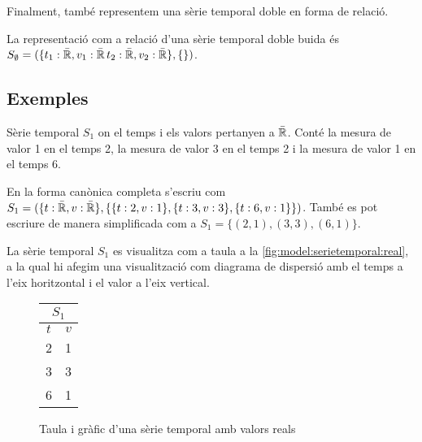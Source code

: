 Finalment, també representem una sèrie temporal doble en forma de
relació.
\begin{definition}
  La representació com a relació d'una sèrie temporal doble buida és
  $S_{\emptyset} = ( \{t_1: \bar{\mathbb{R}{}}, v_1: \bar{\mathbb{R}{}}\,
  t_2: \bar{\mathbb{R}{}}, v_2: \bar{\mathbb{R}{}}\}, \{ \} )$.
\end{definition}




\subsection{Exemples}




\begin{example}
  Sèrie temporal $S_1$ on el temps i els valors pertanyen a
  $\bar{\mathbb{R}{}}$. Conté la mesura de valor 1 en el temps 2, la mesura de
  valor 3 en el temps 2 i la mesura de valor 1 en el temps 6.

En la forma canònica completa s'escriu com $S_1 = ( \{t:
\bar{\mathbb{R}{}}, v: \bar{\mathbb{R}{}}\}, \{ \{t:2,v:1\}, \{t:3,v:3\},
\{t:6,v:1\} \} )$. També es pot escriure de manera simplificada com a
$S_1 = \{ (2,1), (3,3), (6,1) \}$.


La sèrie temporal $S_1$ es visualitza com a taula a la
\autoref{fig:model:serietemporal:real}, a la qual hi afegim una
visualització com diagrama de dispersió amb el temps a l'eix
horitzontal i el valor a l'eix vertical.

\begin{figure}[tp]
  \centering
  \begin{tabular}[c]{|c|c|}
    \multicolumn{2}{c}{$S_1$} \\ \hline
    $t$  & $v$ \\ \hline
    2  & 1 \\
    3  & 3 \\
    6  & 1 \\ \hline
  \end{tabular} \qquad
  \caption{Taula i gràfic d'una sèrie temporal amb valors reals}
  \label{fig:model:serietemporal:real}
\end{figure}

\end{example}


